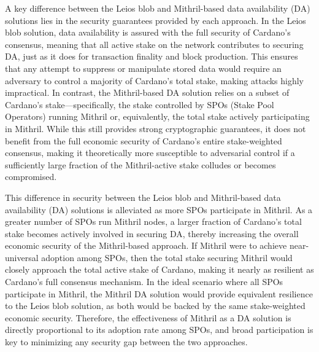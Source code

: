 \documentclass[../midgard.tex]{subfiles}
\begin{document}
A key difference between the Leios blob and Mithril-based data availability (DA) solutions lies in the security guarantees provided by each approach. In the Leios blob solution, data availability is assured with the full security of Cardano’s consensus, meaning that all active stake on the network contributes to securing DA, just as it does for transaction finality and block production. This ensures that any attempt to suppress or manipulate stored data would require an adversary to control a majority of Cardano’s total stake, making attacks highly impractical. In contrast, the Mithril-based DA solution relies on a subset of Cardano’s stake—specifically, the stake controlled by SPOs (Stake Pool Operators) running Mithril or, equivalently, the total stake actively participating in Mithril. While this still provides strong cryptographic guarantees, it does not benefit from the full economic security of Cardano’s entire stake-weighted consensus, making it theoretically more susceptible to adversarial control if a sufficiently large fraction of the Mithril-active stake colludes or becomes compromised. 

This difference in security between the Leios blob and Mithril-based data availability (DA) solutions is alleviated as more SPOs participate in Mithril. As a greater number of SPOs run Mithril nodes, a larger fraction of Cardano's total stake becomes actively involved in securing DA, thereby increasing the overall economic security of the Mithril-based approach. If Mithril were to achieve near-universal adoption among SPOs, then the total stake securing Mithril would closely approach the total active stake of Cardano, making it nearly as resilient as Cardano's full consensus mechanism. In the ideal scenario where all SPOs participate in Mithril, the Mithril DA solution would provide equivalent resilience to the Leios blob solution, as both would be backed by the same stake-weighted economic security. Therefore, the effectiveness of Mithril as a DA solution is directly proportional to its adoption rate among SPOs, and broad participation is key to minimizing any security gap between the two approaches.
\end{document}
